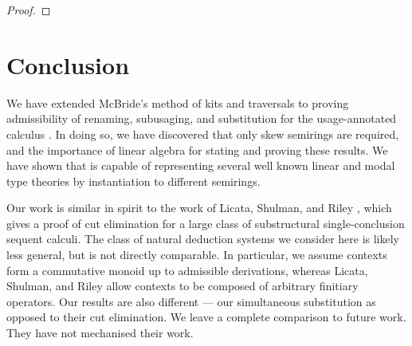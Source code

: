 \documentclass[submission,copyright,creativecommons]{eptcs}
\begin{document}
\begin{proof}
%
\end{proof}

\section{Conclusion}\label{sec:conclusion}

We have extended McBride's method of kits and traversals to proving
admissibility of renaming, subusaging, and substitution for the
usage-annotated calculus \name{}. In doing so, we have discovered that
only skew semirings are required, and the importance of linear algebra
for stating and proving these results.
We have shown that \name{} is capable of representing several well known
linear and modal type theories by instantiation to different semirings.




Our work is similar in spirit to the work of Licata, Shulman, and
Riley \cite{LicataSR17}, which gives a proof of cut elimination for a
large class of substructural single-conclusion sequent calculi.
The class of natural deduction systems we consider here is likely less
general, but is not directly comparable.
In particular, we assume contexts form a commutative monoid up to admissible
derivations, whereas Licata, Shulman, and Riley allow contexts to be composed
of arbitrary finitiary operators.
Our results are also different --- our simultaneous substitution as opposed to
their cut elimination.
We leave a complete comparison to future work.
They have not mechanised their work.
\end{document}
